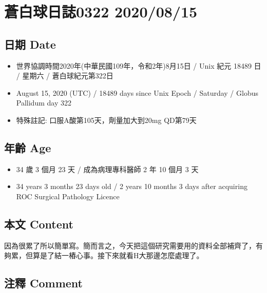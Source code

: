 \documentclass[a5paper, 11pt
]{book}
\providecommand{\tightlist}{%
  \setlength{\itemsep}{0pt}\setlength{\parskip}{0pt}}
\begin{document}
\hypertarget{ux84bcux767dux7403ux65e5ux8a8c0322-20200815}{%
\section{蒼白球日誌0322
2020/08/15}\label{ux84bcux767dux7403ux65e5ux8a8c0322-20200815}}

\hypertarget{ux65e5ux671f-date-75}{%
\subsection{日期 Date}\label{ux65e5ux671f-date-75}}

\begin{itemize}
\tightlist
\item
  世界協調時間2020年(中華民國109年，令和2年)8月15日 / Unix 紀元 18489 日
  / 星期六 / 蒼白球紀元第322日
\item
  August 15, 2020 (UTC) / 18489 days since Unix Epoch / Saturday /
  Globus Pallidum day 322
\item
  特殊註記: 口服A酸第105天，劑量加大到20mg QD第79天
\end{itemize}

\hypertarget{ux5e74ux9f61-age-75}{%
\subsection{年齡 Age}\label{ux5e74ux9f61-age-75}}

\begin{itemize}
\tightlist
\item
  34 歲 3 個月 23 天 / 成為病理專科醫師 2 年 10 個月 3 天
\item
  34 years 3 months 23 days old / 2 years 10 months 3 days after
  acquiring ROC Surgical Pathology Licence
\end{itemize}

\hypertarget{ux672cux6587-content-75}{%
\subsection{本文 Content}\label{ux672cux6587-content-75}}

因為很累了所以簡單寫。簡而言之，今天把這個研究需要用的資料全部補齊了，有夠累，但算是了結一樁心事。接下來就看H大那邊怎麼處理了。

\hypertarget{ux6ce8ux91cb-comment-75}{%
\subsection{注釋 Comment}\label{ux6ce8ux91cb-comment-75}}
\end{document}
